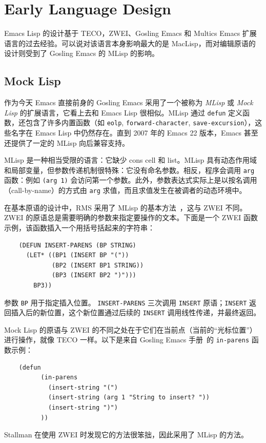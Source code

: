 \documentclass[format=acmsmall,screen]{acmart}
\begin{document}
\section{Early Language Design}         %
\label{sec:early-history}

Emacs Lisp 的设计基于 TECO，ZWEI、Gosling Emacs 和 Multics Emacs 扩展语言的过去经验。可以说对该语言本身影响最大的是 MacLisp，而对编辑原语的设计则受到了 Gosling Emacs 的 MLisp 的影响。

\subsection{Mock Lisp}
\label{sec:mock-lisp}

作为今天 Emacs 直接前身的 Gosling Emacs 采用了一个被称为 \emph{MLisp} 或 \emph{Mock Lisp} 的扩展语言，它看上去和 Emacs Lisp 很相似。MLisp 通过 \texttt{defun} 定义函数，还包含了许多内置函数（如 \texttt{eolp}, \texttt{forward-character}, \texttt{save-excursion}），这些名字在 Emacs Lisp 中仍然存在。直到 2007 年的 Emacs 22 版本，Emacs 甚至还提供了一定的 MLisp 向后兼容支持。

MLisp 是一种相当受限的语言：它缺少 cons cell 和 list。MLisp 具有动态作用域和局部变量，但参数传递机制很特殊：它没有命名参数。相反，程序会调用 \texttt{arg} 函数：例如 \texttt{(arg 1)} 会访问第一个参数。此外，参数表达式实际上是以按名调用（call-by-name）的方式由 \texttt{arg} 求值，而且求值发生在被调者的动态环境中。

在基本原语的设计中，RMS 采用了 MLisp 的基本方法~\cite{Stallman2018-personal}，这与 ZWEI 不同。ZWEI 的原语总是需要明确的参数来指定要操作的文本。下面是一个 ZWEI 函数示例，该函数插入一个用括号括起来的字符串：
%
\begin{verbatim}
    (DEFUN INSERT-PARENS (BP STRING)
      (LET* ((BP1 (INSERT BP "("))
             (BP2 (INSERT BP1 STRING))
             (BP3 (INSERT BP2 ")")))
        BP3))
\end{verbatim}
%

参数 \texttt{BP} 用于指定插入位置。 \texttt{INSERT-PARENS} 三次调用 \texttt{INSERT} 原语；\texttt{INSERT} 返回插入后的新位置，这个新位置通过后续的 \texttt{INSERT} 调用线性传递，并最终返回。

Mock Lisp 的原语与 ZWEI 的不同之处在于它们在当前点（当前的“光标位置”）进行操作，就像 TECO 一样。以下是来自 Gosling Emacs 手册~\cite{Gosling1981}的 \texttt{in-parens} 函数示例：
%
\begin{verbatim}
    (defun
          (in-parens
            (insert-string "(")
            (insert-string (arg 1 "String to insert? "))
            (insert-string ")")
          ))
\end{verbatim}
%
Stallman 在使用 ZWEI 时发现它的方法很笨拙，因此采用了 MLisp 的方法。
\clearpage
\end{document}

